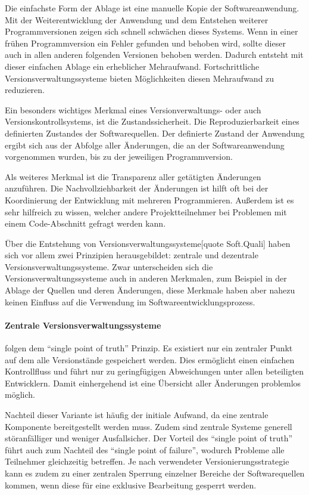 Die einfachste Form der Ablage ist eine manuelle Kopie der Softwareanwendung. Mit der Weiterentwicklung der Anwendung und 
dem Entstehen weiterer Programmversionen zeigen sich schnell schwächen dieses Systems. Wenn in einer frühen 
Programmversion ein Fehler gefunden und behoben wird, sollte dieser auch in allen anderen folgenden Versionen behoben 
werden. Dadurch entsteht mit dieser einfachen Ablage ein erheblicher Mehraufwand. Fortschrittliche 
Versionsverwaltungssysteme bieten Möglichkeiten diesen Mehraufwand zu reduzieren.

Ein besonders wichtiges Merkmal eines Versionverwaltungs- oder auch Versionskontrollsystems, ist die Zustandssicherheit. 
Die Reproduzierbarkeit eines definierten Zustandes der Softwarequellen. Der definierte Zustand der Anwendung ergibt sich 
aus der Abfolge aller Änderungen, die an der Softwareanwendung vorgenommen wurden, bis zu der jeweiligen Programmversion. 

Als weiteres Merkmal ist die Transparenz aller getätigten Änderungen anzuführen. Die Nachvollziehbarkeit der Änderungen 
ist hilft oft bei der Koordinierung der Entwicklung mit mehreren Programmieren. Außerdem ist es sehr hilfreich zu wissen, 
welcher andere Projektteilnehmer bei Problemen mit einem Code-Abschnitt gefragt werden kann. 

Über die Entstehung von Versionsverwaltungssysteme[quote Soft.Quali] haben sich vor allem zwei Prinzipien herausgebildet: 
zentrale und dezentrale Versionsverwaltungssysteme. Zwar unterscheiden sich die Versionsverwaltungssysteme auch in 
anderen Merkmalen, zum Beispiel in der Ablage der Quellen und deren Änderungen, diese Merkmale haben aber nahezu keinen 
Einfluss auf die Verwendung im Softwareentwicklungsprozess.

\paragraph{Zentrale Versionsverwaltungssysteme} folgen dem ``single point of truth'' Prinzip. Es existiert nur ein 
zentraler Punkt auf dem alle Versionstände gespeichert werden. Dies ermöglicht einen einfachen Kontrollfluss und führt nur zu geringfügigen Abweichungen unter allen beteiligten Entwicklern. Damit einhergehend ist eine Übersicht aller Änderungen problemlos möglich.

Nachteil dieser Variante ist häufig der initiale Aufwand, da eine zentrale Komponente bereitgestellt werden muss. Zudem 
sind zentrale Systeme generell störanfälliger und weniger Ausfallsicher. Der Vorteil des ``single point of truth'' führt 
auch zum Nachteil des ``single point of failure'', wodurch Probleme alle Teilnehmer gleichzeitig betreffen.
Je nach verwendeter Versionierungsstrategie kann es zudem zu einer zentralen Sperrung einzelner Bereiche der Softwarequellen kommen, wenn diese für eine exklusive Bearbeitung gesperrt werden.

